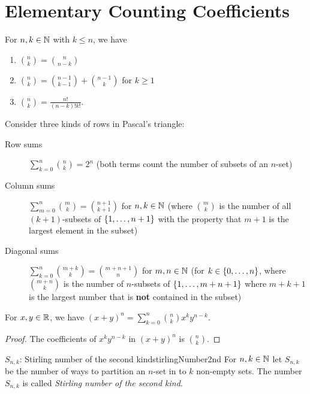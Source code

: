 \documentclass[language=english]{../../Template/TemplateLecture}
\begin{document}
\section{Elementary Counting Coefficients}

\begin{prop}
    For $n, k \in \mathbb{N}$ with $k \leq n$, we have 
    \begin{enumerate}[$(a)$]
        \item $\binom{n}{k} = \binom{n}{n-k}$
        \item $\binom{n}{k} = \binom{n-1}{k-1} + \binom{n-1}{k}$ for $k \geq 1$
        \item $\binom{n}{k} = \frac{n!}{(n-k)!k!}$.
    \end{enumerate}
\end{prop}

Consider three kinds of rows in Pascal's triangle:

\begin{description}
    \item[Row sums] $\sum_{k = 0}^n \binom{n}{k} = 2^n$ (both terms count the number of subsets of an $n$-set)
    \item[Column sums] $\sum_{m = 0}^n \binom{m}{k} = \binom{n+1}{k+1}$ for $n, k \in \mathbb{N}$ (where $\binom{m}{k}$ is the number of all $(k+1)$-subsets of $\{1,\ldots,n+1\}$ with the property that $m+1$ is the largest element in the subset)
    \item[Diagonal sums] $\sum_{k = 0}^n \binom{m + k}{k} = \binom{m + n + 1}{n}$ for $m, n \in \mathbb{N}$ (for $k \in \{0,\ldots,n\}$, where $\binom{m+n}{k}$ is the number of $n$-subsets of $\{1,\ldots,m+n+1\}$ where $m+k+1$ is the largest number that is \textbf{not} contained in the subset)  
\end{description}

\begin{prop}
    For $x, y \in \mathbb{R}$, we have $(x + y)^n = \sum_{k = 0}^n \binom{n}{k}x^k y^{n-k}$.
\end{prop}

\begin{proof}
    The coefficients of $x^k y^{n-k}$ in $(x + y)^n$ is $\binom{n}{k}$.
\end{proof}

\begin{defi}{$S_{n,k}$: Stirling number of the second kind}{stirlingNumber2nd}
    For $n, k \in \mathbb{N}$ let $S_{n,k}$ be the number of ways to partition an $n$-set in to $k$ non-empty sets. The number $S_{n,k}$ is called \emph{Stirling number of the second kind}.
\end{defi}
\end{document}
